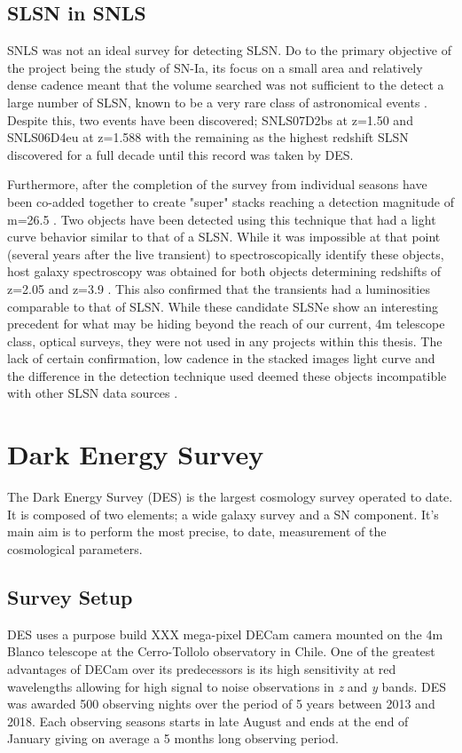 \subsection{SLSN in SNLS}
SNLS was not an ideal survey for detecting SLSN. Do to the primary objective of the project being the study of SN-Ia, its focus on a small area and relatively dense cadence meant that the volume searched was not sufficient to the detect a large number of SLSN, known to be a very rare class of astronomical events \citep{Cooke2012Superluminous3.90.,Prajs2017The1,Quimby2013Rates0.2}. Despite this, two events have been discovered; SNLS07D2bs at z=1.50 and SNLS06D4eu at z=1.588 with the remaining as the highest redshift SLSN discovered for a full decade until this record was taken by DES. 

Furthermore, after the completion of the survey from individual seasons have been co-added together to create "super" stacks reaching a detection magnitude of m=26.5 \citep{Cooke2012Superluminous3.90.}. Two objects have been detected using this technique that had a light curve behavior similar to that of a SLSN. While it was impossible at that point (several years after the live transient) to spectroscopically identify these objects, host galaxy spectroscopy was obtained for both objects determining redshifts of z=2.05 and z=3.9 \citep{Cooke2012Superluminous3.90.}. This also confirmed that the transients had a luminosities comparable to that of SLSN. While these candidate SLSNe show an interesting precedent for what may be hiding beyond the reach of our current, 4m telescope class, optical surveys, they were not used in any projects within this thesis. The lack of certain confirmation, low cadence in the stacked images light curve and the difference in the detection technique used deemed these objects incompatible with other SLSN data sources \citep{Prajs2017The1}.  

\section{Dark Energy Survey}
The Dark Energy Survey (DES) is the largest cosmology survey operated to date. It is composed of two elements; a wide galaxy survey and a SN component. It's main aim is to perform the most precise, to date, measurement of the cosmological parameters. 

\subsection{Survey Setup}
DES uses a purpose build XXX mega-pixel DECam camera mounted on the 4m Blanco telescope at the Cerro-Tollolo observatory in Chile. One of the greatest advantages of DECam over its predecessors is its high sensitivity at red wavelengths allowing for high signal to noise observations in \textit{z} and \textit{y} bands. DES was awarded 500 observing nights over the period of 5 years between 2013 and 2018. Each observing seasons starts in late August and ends at the end of January giving on average a 5 months long observing period.   


